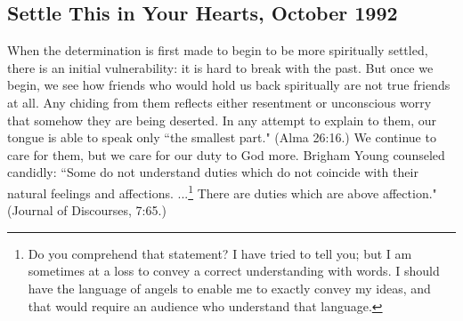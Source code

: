 \subsection{Settle This in Your Hearts, October 1992}

When the determination is first made to begin to be more spiritually settled, there is an initial vulnerability: it is hard to break with the past. But once we begin, we see how friends who would hold us back spiritually are not true friends at all. Any chiding from them reflects either resentment or unconscious worry that somehow they are being deserted. In any attempt to explain to them, our tongue is able to speak only ``the smallest part." (Alma 26:16.) We continue to care for them, but we care for our duty to God more. Brigham Young counseled candidly: ``Some do not understand duties which do not coincide with their natural feelings and affections. ...\footnote{Do you comprehend that statement? I have tried to tell you; but I am sometimes at a loss to convey a correct understanding with words. I should have the language of angels to enable me to exactly convey my ideas, and that would require an audience who understand that language.} There are duties which are above affection." (Journal of Discourses, 7:65.)